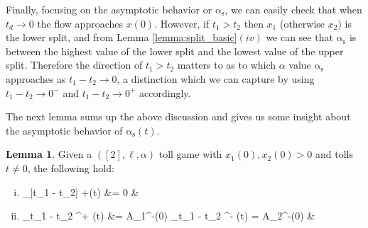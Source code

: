 \documentclass[10pt,a4paper]{book}
\newcommand{\as}{\mathrm{\alpha_s}}
\theoremstyle{definition}
\newtheorem{lemma}[definition]{Lemma}
\theoremstyle{comment}
\begin{document}
Finally, focusing on the asymptotic behavior or $\as$, we can easily check that when $t_d \rightarrow 0$ the flow approaches $x(0)$.
However, if $t_1 > t_2$ then $x_1$ (otherwise $x_2$) is the lower split, and from Lemma \ref{lemma:split_basic}$(iv)$ we can see that $\as$ is between the highest value of the lower split and the lowest value of the upper split.
Therefore the direction of $t_1 > t_2$ matters to as to which $\alpha$ value $\as$ approaches as $t_1 - t_2 \rightarrow 0$, a distinction which we can capture by using $t_1 - t_2 \rightarrow 0^-$ and $t_1 - t_2 \rightarrow 0^+$ accordingly.

The next lemma sums up the above discussion and gives us some insight about the asymptotic behavior of $\as(t)$.
\begin{lemma}
	\label{lemma:split_asymptotic}
	Given a $([2], \ell, \alpha)$ toll game with $x_1(0), x_2(0) > 0$ and tolls $t \ne 0$, the following hold:
	\begin{enumerate}[(i)]
		\item
		\begin{flalign*}
			\lim_{|t_1 - t_2| \rightarrow +\infty}\as(t) &= 0 &
		\end{flalign*}
		\item
		\begin{flalign*}
			\lim_{t_1 - t_2 ^+} \as(t) &= \sup A_1^-(0) \qquad {} \qquad \lim_{t_1 - t_2 ^-} \as(t) = \sup A_2^-(0) &
		\end{flalign*}
	\end{enumerate}
\end{lemma}
\end{document}
